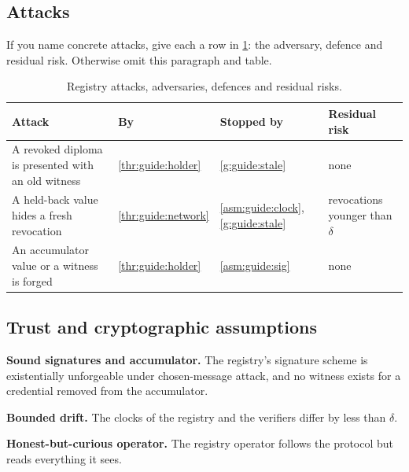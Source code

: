 \subsection[Attacks]{Attacks\skimmark}\label{app:chapters:attacks}
If you name concrete attacks, give each a row in \cref{tab:guide:attacks}: the adversary, defence and residual risk. Otherwise omit this paragraph and table.
\begin{table}[!ht]
  \centering
  \caption{Registry attacks, adversaries, defences and residual risks.}
  \label{tab:guide:attacks}
  {\small
  \begin{tabularx}{\linewidth}{>{\raggedright\arraybackslash}X l >{\raggedright\arraybackslash}X >{\raggedright\arraybackslash}X}
    \toprule
    \textbf{Attack} & \textbf{By} & \textbf{Stopped by} & \textbf{Residual risk} \\
    \midrule
    A revoked diploma is presented with an old witness & \cref{thr:guide:holder} & \cref{g:guide:stale} & none \\
    A held-back value hides a fresh revocation & \cref{thr:guide:network} & \cref{asm:guide:clock}, \cref{g:guide:stale} & revocations younger than $\delta$ \\
    An accumulator value or a witness is forged & \cref{thr:guide:holder} & \cref{asm:guide:sig} & none \\
    \bottomrule
  \end{tabularx}
  }
\end{table}

\subsection[Trust and cryptographic assumptions]{Trust and cryptographic assumptions\skimmark}\label{app:chapters:assumptions}
\begin{assumptions}
  \item\label{asm:guide:sig} \textbf{Sound signatures and accumulator.} The registry's signature scheme is existentially unforgeable under chosen-message attack, and no witness exists for a credential removed from the accumulator.
  \item\label{asm:guide:clock} \textbf{Bounded drift.} The clocks of the registry and the verifiers differ by less than $\delta$.
  \item\label{asm:guide:operator} \textbf{Honest-but-curious operator.} The registry operator follows the protocol but reads everything it sees.
\end{assumptions}

